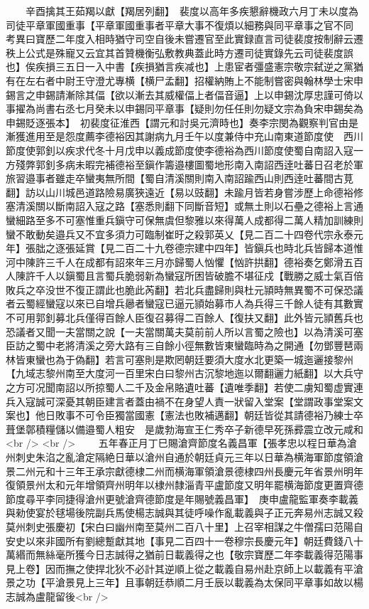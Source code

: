 　　辛酉擒其王茹羯以獻【羯居列翻】　裴度以高年多疾懇辭機政六月丁未以度為司徒平章軍國重事【平章軍國重事者平章大事不復煩以細務與同平章事之官不同　考異曰寶歷二年度入相時猶守司空自後未嘗遷官至此實録直言司徒裴度按制辭云遷秩上公式是殊寵又云宜其首贊機衡弘敷教典蓋此時方遷司徒實錄先云司徒裴度誤也】俟疾損三五日一入中書【疾損猶言疾减也】上患宦者彊盛憲宗敬宗弑逆之黨猶有在左右者中尉王守澄尤專横【横尸孟翻】招權納賄上不能制嘗密與翰林學士宋申錫言之申錫請漸除其偪【欲以漸去其威權偪上者偪音逼】上以申錫沈厚忠謹可倚以事擢為尚書右丞七月癸未以申錫同平章事【疑則勿任任則勿疑文宗為負宋申錫矣為申錫貶逐張本】　初裴度征淮西【謂元和討吳元濟時也】奏李宗閔為觀察判官由是漸獲進用至是怨度薦李德裕因其謝病九月壬午以度兼侍中充山南東道節度使　西川節度使郭釗以疾求代冬十月戊申以義成節度使李德裕為西川節度使蜀自南詔入寇一方殘弊郭釗多病未暇完補德裕至鎭作籌邉樓圖蜀地形南入南詔西逹吐蕃日召老於軍旅習邉事者雖走卒蠻夷無所間【蜀自清溪關則南入南詔踰西山則西逹吐蕃間古莧翻】訪以山川城邑道路險易廣狹遠近【易以豉翻】未踰月皆若身嘗涉歷上命德裕修塞清溪關以斷南詔入寇之路【塞悉則翻下同斷音短】或無土則以石壘之德裕上言通蠻細路至多不可塞惟重兵鎭守可保無虞但黎雅以來得萬人成都得二萬人精加訓練則蠻不敢動矣邉兵又不宜多須力可臨制崔旴之殺郭英乂【見二百二十四卷代宗永泰元年】張朏之逐張延賞【見二百二十九卷德宗建中四年】皆鎭兵也時北兵皆歸本道惟河中陳許三千人在成都有詔來年三月亦歸蜀人忷懼【忷許拱翻】德裕奏乞鄭滑五百人陳許千人以鎭蜀且言蜀兵脆弱新為蠻寇所困皆破膽不堪征戍【戰勝之威士氣百倍敗兵之卒没世不復正謂此也脆此芮翻】若北兵盡歸則與杜元頴時無異蜀不可保恐議者云蜀經蠻寇以來已自增兵曏者蠻寇已逼元頴始募市人為兵得三千餘人徒有其數實不可用郭釗募北兵僅得百餘人臣復召募得二百餘人【復扶又翻】此外皆元頴舊兵也恐議者又聞一夫當關之說【一夫當關萬夫莫前前人所以言蜀之險也】以為清溪可塞臣訪之蜀中老將清溪之旁大路有三自餘小徑無數皆東蠻臨時為之開通【勿鄧豐琶兩林皆東蠻也為于偽翻】若言可塞則是欺罔朝廷要須大度水北更築一城迤邐接黎州【九域志黎州南至大度河一百里宋白曰黎州古沉黎地迤以爾翻邐力紙翻】以大兵守之方可况聞南詔以所掠蜀人二千及金帛賂遺吐蕃【遺唯季翻】若使二虜知蜀虚實連兵入寇誠可深憂其朝臣建言者蓋由禍不在身望人責一狀留入堂案【堂謂政事堂案文案也】他日敗事不可令臣獨當國憲【憲法也敗補邁翻】朝廷皆從其請德裕乃練士卒葺堡鄣積糧儲以備邉蜀人粗安　是歲勃海宣王仁秀卒子新德早死孫彛震立改元咸和<br />
<br />
　　五年春正月丁巳賜滄齊節度名義昌軍【張孝忠以程日華為滄州刺史朱淊之亂滄定隔絶日華以滄州自通於朝廷貞元三年以日華為横海軍節度領滄景二州元和十三年王承宗獻德棣二州而横海軍領滄景德棣四州長慶元年省景州明年復領景州太和元年增領齊州明年以棣州隸淄青平盧節度又明年罷横海節度更置齊德節度尋平李同捷得滄州更號滄齊德節度是年賜號義昌軍】　庚申盧龍監軍奏李載義與勑使宴於毬場後院副兵馬使楊志誠與其徒呼噪作亂載義與子正元奔易州志誠又殺莫州刺史張慶初【宋白曰幽州南至莫州二百八十里】上召宰相謀之牛僧孺曰范陽自安史以來非國所有劉總蹔獻其地【事見二百四十一卷穆宗長慶元年】朝廷費錢八十萬緡而無絲毫所獲今日志誠得之猶前日載義得之也【敬宗寶歷二年李載義得范陽事見上卷】因而撫之使捍北狄不必計其逆順上從之載義自易州赴京師上以載義有平滄景之功【平滄景見上三年】且事朝廷恭順二月壬辰以載義為太保同平章事如故以楊志誠為盧龍留後<br />
